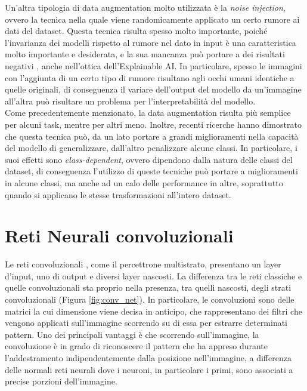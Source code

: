 Un'altra tipologia di data augmentation molto utilizzata è la \textit{noise injection}, ovvero la tecnica nella quale viene randomicamente applicato un certo rumore ai dati del dataset. Questa tecnica risulta spesso molto importante, poiché l'invarianza dei modelli rispetto al rumore nel dato in input è una caratteristica molto importante e desiderata, e la sua mancanza può portare a dei risultati negativi \cite{deep_trouble}, anche nell'ottica dell'Explainable AI. In particolare, spesso le immagini con l'aggiunta di un certo tipo di rumore risultano agli occhi umani identiche a quelle originali, di conseguenza il variare dell'output del modello da un'immagine all'altra può risultare un problema per l'interpretabilità del modello.
\\
Come precedentemente menzionato, la data augmentation risulta più semplice  per alcuni task, mentre per altri meno. Inoltre, recenti ricerche \cite{data_aug_effects} hanno dimostrato che questa tecnica può, da un lato portare a grandi miglioramenti nella capacità del modello di generalizzare, dall'altro penalizzare alcune classi. In particolare, i suoi effetti sono \textit{class-dependent}, ovvero dipendono dalla natura delle classi del dataset, di conseguenza l'utilizzo di queste tecniche può portare a miglioramenti in alcune classi, ma anche ad un calo delle performance in altre, soprattutto quando si applicano le stesse trasformazioni all'intero dataset.









\section{Reti Neurali convoluzionali}
Le reti convoluzionali \cite{convnets}, come il percettrone multistrato, presentano un layer d'input, uno di output e diversi layer nascosti. La differenza tra le reti classiche e quelle convoluzionali sta proprio nella presenza, tra quelli nascosti, degli strati convoluzionali (Figura \ref{fig:conv_net}). In particolare, le convoluzioni sono delle matrici la cui dimensione viene decisa in anticipo, che rappresentano dei filtri che vengono applicati sull'immagine scorrendo su di essa per estrarre determinati pattern. Uno dei principali vantaggi è che scorrendo sull'immagine, la convoluzione è in grado di riconoscere il pattern che ha appreso durante l'addestramento indipendentemente dalla posizione nell'immagine, a differenza delle normali reti neurali dove i neuroni, in particolare i primi, sono associati a precise porzioni dell'immagine. 

